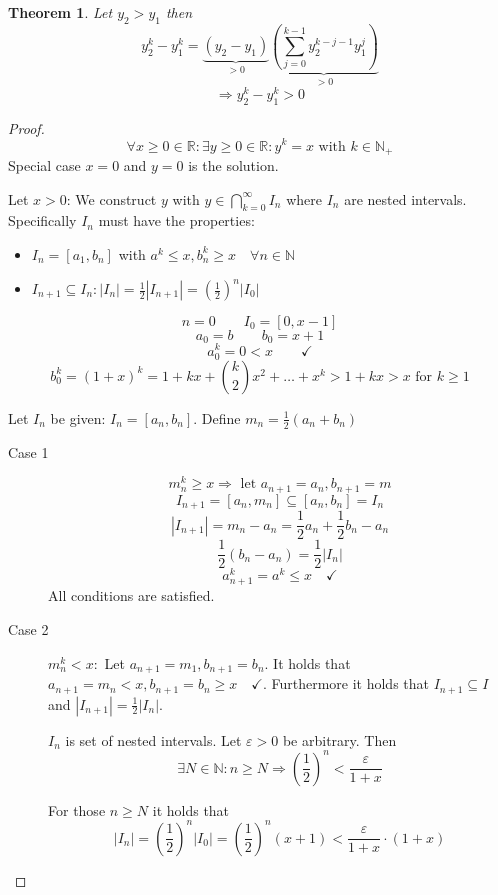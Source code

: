 \documentclass[a4paper,landscape,twocolumn]{article}
\newtheorem{theorem}{Theorem}
\newcommand\abs[1]{\left|#1\right|}
\begin{document}
\begin{theorem}
  Let $y_2 > y_1$ then
  \[ y_2^k - y_1^k = \underbrace{(y_2 - y_1)}_{> 0} \underbrace{\left(\sum_{j=0}^{k-1} y_2^{k-j-1} y_1^j\right)}_{> 0} \]
  \[ \Rightarrow y_2^k - y_1^k > 0 \]
\end{theorem}

\begin{proof}
  \[ \forall x \geq 0 \in \mathbb R: \exists y \geq 0 \in \mathbb R: y^k = x \text{ with } k \in \mathbb N_+ \]
  Special case $x = 0$ and $y = 0$ is the solution.

  Let $x > 0$: We construct $y$ with $y \in \bigcap_{k=0}^\infty I_n$
  where $I_n$ are nested intervals.
  Specifically $I_n$ must have the properties:
  \begin{itemize}
    \item $I_n = [a_1, b_n]$ with $a^k \leq x, b_n^k \geq x \quad \forall n \in \mathbb N$
    \item $I_{n+1} \subseteq I_n: \abs{I_n} = \frac12 \abs{I_{n+1}} = \left(\frac12\right)^n \abs{I_0}$
  \end{itemize}

  \[ n = 0 \qquad I_0 = [0, x-1] \]
  \[ a_0 = b \qquad b_0 = x + 1 \]
  \[ a_0^k = 0 < x \qquad\checkmark \]
  \[ b_0^k = (1 + x)^k = 1 + kx + \binom k2 x^2 + \dots + x^k > 1 + kx > x \text{ for } k \geq 1 \]

  Let $I_n$ be given: $I_n = [a_n, b_n]$.
  Define $m_n = \frac12 (a_n + b_n)$
  \begin{description}
    \item[Case 1]
      \[ m_n^k \geq x \Rightarrow \text{ let } a_{n+1} = a_n, b_{n+1} = m \]
      \[ I_{n+1} = [a_n, m_n] \subseteq [a_n, b_n] = I_n \]
      \[ \abs{I_{n+1}} = m_n - a_n = \frac12 a_n + \frac12 b_n - a_n \]
      \[ \frac12 (b_n - a_n) = \frac12 \abs{I_n} \]
      \[ a_{n+1}^k = a^k \leq x \quad\checkmark \]
      All conditions are satisfied.
    \item[Case 2] $m_n^k < x: $
      Let $a_{n+1} = m_1, b_{n+1} = b_n$.
      It holds that $a_{n+1} = m_n < x, b_{n+1} = b_n \geq x \quad\checkmark$.
      Furthermore it holds that $I_{n+1} \subseteq I$ and $\abs{I_{n+1}} = \frac12 \abs{I_n}$.

      $I_n$ is set of nested intervals.
      Let $\varepsilon > 0$ be arbitrary. Then
      \[ \exists N \in \mathbb N: n \geq N \Rightarrow \left(\frac12\right)^n < \frac{\varepsilon}{1 + x} \]

      For those $n \geq N$ it holds that
      \[
          \abs{I_n} = \left(\frac12\right)^n \abs{I_{0}}
          = \left(\frac12\right)^n (x + 1)
          < \frac{\varepsilon}{1 + x} \cdot (1 + x)
      \]


\end{description}
\end{proof}
\end{document}
